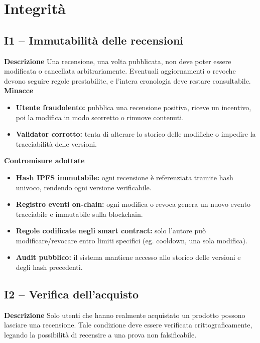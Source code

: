     \section{Integrità}
        \subsection{I1 – Immutabilità delle recensioni}
            \noindent \textbf{Descrizione}
                Una recensione, una volta pubblicata, non deve poter essere modificata o cancellata arbitrariamente. Eventuali aggiornamenti o revoche devono seguire regole prestabilite, e l'intera cronologia deve restare consultabile. \\

            \noindent \textbf{Minacce}
                \begin{itemize}
                    \item \textbf{Utente fraudolento:} pubblica una recensione positiva, riceve un incentivo, poi la modifica in modo scorretto o rimuove contenuti.

                    \item \textbf{Validator corrotto:} tenta di alterare lo storico delle modifiche o impedire la tracciabilità delle versioni.
                \end{itemize}

            \noindent \textbf{Contromisure adottate}
                \begin{itemize}
                    \item \textbf{Hash IPFS immutabile:} ogni recensione è referenziata tramite hash univoco, rendendo ogni versione verificabile.

                    \item \textbf{Registro eventi on-chain:} ogni modifica o revoca genera un nuovo evento tracciabile e immutabile sulla blockchain.

                    \item \textbf{Regole codificate negli smart contract:} solo l'autore può modificare/revocare entro limiti specifici (eg. cooldown, una sola modifica).

                    \item \textbf{Audit pubblico:} il sistema mantiene accesso allo storico delle versioni e degli hash precedenti.
                \end{itemize}

        \subsection{I2 – Verifica dell'acquisto}
            \noindent \textbf{Descrizione}
                Solo utenti che hanno realmente acquistato un prodotto possono lasciare una recensione. Tale condizione deve essere verificata crittograficamente, legando la possibilità di recensire a una prova non falsificabile. \\

